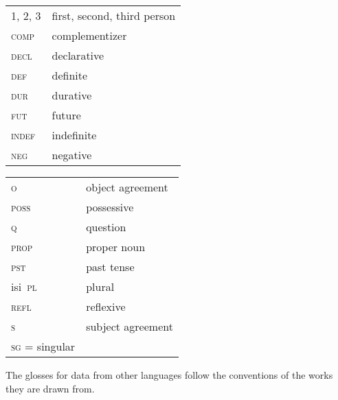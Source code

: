 \documentclass[output=paper]{LSP/langsci}
\begin{document}
\begin{table}
\begin{tabularx}{.45\textwidth}{lX}
 1, 2, 3 & first, second, third person\\
 \textsc{comp} & complementizer \\
 \textsc{decl} & declarative \\
 \textsc{def} & definite \\
 \textsc{dur} & durative \\
 \textsc{fut} & future \\
 \textsc{indef} & indefinite \\
 \textsc{neg} & negative \\
\end{tabularx}
\begin{tabularx}{.45\textwidth}{lX}
 \textsc{o} & {object} agreement \\
 \textsc{poss} & possessive \\
 \textsc{q} & question \\
 \textsc{prop} & proper noun \\
 \textsc{pst} & past tense \\isi\
 \textsc{pl} & plural \\
 \textsc{refl} & reflexive \\
 \textsc{s} & {subject} \newline agreement \\
 \textsc{sg} = singular
 
\end{tabularx}
\end{table}
 
 The glosses for data from other languages follow the conventions of the works they are drawn from.
 
 
 
{\sloppy 
\printbibliography[heading=subbibliography,notkeyword=this]
}

\let\eachwordtwo=\upshape
\end{document}
